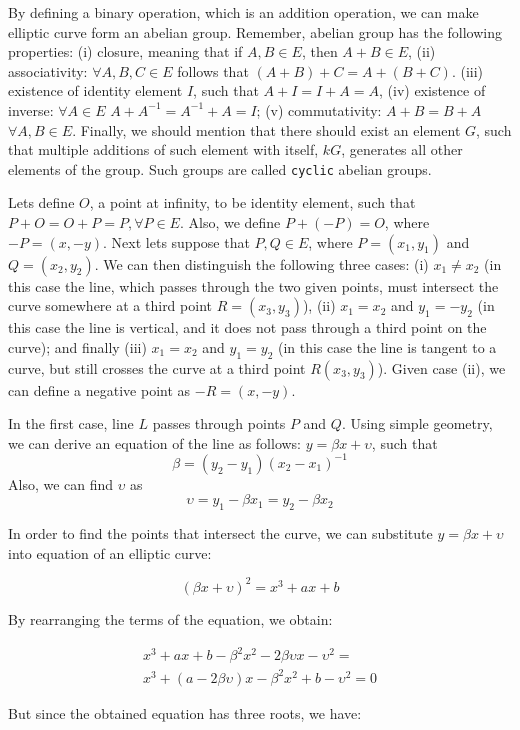 By defining a binary operation, which is an addition operation, we can make 
elliptic curve form an abelian group. Remember, abelian group has the following
properties: (i) closure, meaning that if $A, B \in E$, then $A+B\in E$,
(ii) associativity: $\forall A,B,C \in E$ follows that $(A+B)+C=A+(B+C)$.
(iii) existence of identity element $I$, such that $A+I=I+A=A$, (iv)
existence of inverse: $\forall A \in E$ $A+A^{-1}=A^{-1}+A=I$; (v)
commutativity: $A+B=B+A$ $\forall A, B\in E$. Finally, we should 
mention that there should exist an element $G$, such that multiple additions 
of such element with itself, $kG$, generates all other elements of the group. Such groups
are called \texttt{cyclic} abelian groups.

Lets define $O$, a point at infinity, to be identity element, such 
that $P+O = O + P = P, \forall P \in E$. Also, we define 
$P+(-P)=O$, where $-P=(x, -y)$. Next lets 
suppose that $P, Q \in E$, where $P=(x_1, y_1)$ and $Q=(x_2, y_2)$. We 
can then distinguish the following three cases: (i) $x_1 \neq x_2$ (in this
case the line, which passes through the two given points, 
must intersect the curve somewhere at a third point $R = (x_3, y_3)$), 
(ii) $x_1 = x_2$ and $y_1=-y_2$ (in this case the line is vertical, and it does not
pass through a third point on the curve); and finally (iii) $x_1=x_2$ and $y_1=y_2$
(in this case the line is tangent to a curve, but still crosses the curve at a 
third point $R(x_3, y_3)$). Given case (ii), we can define a negative point 
as $-R = (x, -y)$.

In the first case, line $L$ passes through points $P$ and $Q$. Using simple geometry, 
we can derive an equation of the line as follows: $y = \beta x + \upsilon$, such that
$$\beta = (y_2-y_1)(x_2-x_1)^{-1}$$ Also, we can find $\upsilon$ as 
$$\upsilon=y_1-\beta x_1=y_2-\beta x_2$$

In order to find the points that intersect the curve, we can substitute $y=\beta x+ \upsilon$
into equation of an elliptic curve:

$$(\beta x+ \upsilon)^2=x^3+ax+b$$

By rearranging the terms of the equation, we obtain:

\begin{multline*}
x^3+ax+b-\beta^2x^2-2\beta \upsilon x - \upsilon^2=\\
x^3+(a-2\beta \upsilon)x-\beta^2x^2+b-\upsilon^2=0
\end{multline*}

But since the obtained equation has three roots, we have:

